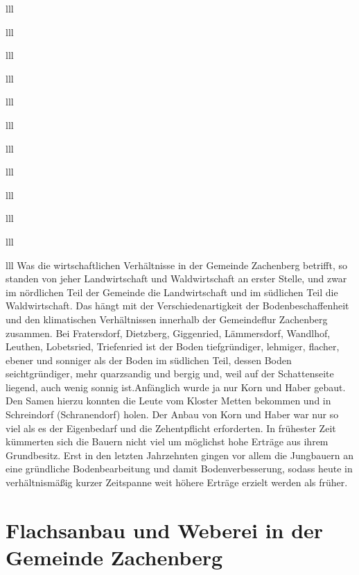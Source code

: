 \documentclass[12pt,a4pager]{book}
\begin{document}
\begin{tabuluar}{lll}
\begin{tabuluar}{lll}
\begin{tabuluar}{lll}
\begin{tabuluar}{lll}
\begin{tabuluar}{lll}
\begin{tabuluar}{lll}
\begin{tabuluar}{lll}
\begin{tabuluar}{lll}
\begin{tabuluar}{lll}
\begin{tabuluar}{lll}
\begin{tabuluar}{lll}
\begin{tabuluar}{lll}
Was die wirtschaftlichen Verhältnisse in der Gemeinde Zachenberg betrifft, so
standen von jeher Landwirtschaft und Waldwirtschaft an erster Stelle, und zwar
im nördlichen Teil der Gemeinde die Landwirtschaft und im südlichen Teil die
Waldwirtschaft. Das hängt mit der Verschiedenartigkeit der Bodenbeschaffenheit
und den klimatischen Verhältnissen innerhalb der Gemeindeflur Zachenberg
zusammen. Bei Fratersdorf, Dietzberg, Giggenried, Lämmersdorf, Wandlhof,
Leuthen, Lobetsried, Triefenried ist der Boden tiefgründiger, lehmiger, flacher,
ebener und sonniger als der Boden im südlichen Teil, dessen Boden
seichtgründiger, mehr quarzsandig und bergig und, weil auf der Schattenseite
liegend, auch wenig sonnig ist.Anfänglich wurde ja nur Korn und Haber gebaut.
Den Samen hierzu konnten die Leute vom Kloster Metten bekommen und in
Schreindorf (Schranendorf) holen. Der Anbau von Korn und Haber war nur so viel
als es der Eigenbedarf und die Zehentpflicht erforderten. In frühester Zeit
kümmerten sich die Bauern nicht viel um möglichst hohe Erträge aus ihrem
Grundbesitz. Erst in den letzten Jahrzehnten gingen vor allem die Jungbauern an
eine gründliche Bodenbearbeitung und damit Bodenverbesserung, sodass heute in
verhältnismäßig kurzer Zeitspanne weit höhere Erträge erzielt werden als früher.

\section{Flachsanbau und Weberei in der Gemeinde Zachenberg}


\end{tabuluar}
\end{tabuluar}
\end{tabuluar}
\end{tabuluar}
\end{tabuluar}
\end{tabuluar}
\end{tabuluar}
\end{tabuluar}
\end{tabuluar}
\end{tabuluar}
\end{tabuluar}
\end{tabuluar}
\end{document}
